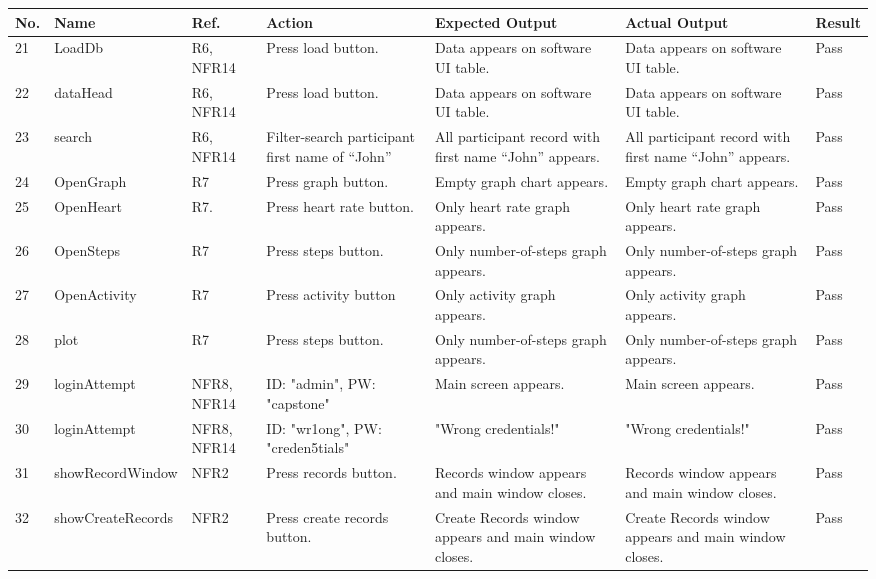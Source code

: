 \documentclass[12pt, titlepage]{article}
\begin{document}
\begin{center}
\begin{table} 
\begin{tabular}{ | p{0.5cm} | p{2.8cm} |  p{1.1cm} | p{2.7cm} | p{2.7cm} | p{2.7cm} | p{1.1cm} |}
\hline
\textbf{No.} & \textbf{Name}  & \textbf{Ref.} & \textbf{Action} & \textbf{Expected Output} & \textbf{Actual Output} & \textbf{Result} \\
\hline
21 & LoadDb & R6, NFR14 & Press load button. & Data appears on software UI table. &  Data appears on software UI table. & Pass \\ 
\hline
22 & dataHead & R6, NFR14 & Press load button. & Data appears on software UI table. & Data appears on software UI table. & Pass \\ 
\hline
23 & search & R6, NFR14 & Filter-search participant first name of “John” & All participant record with first name “John” appears. & All participant record with first name “John” appears. & Pass \\ 
\hline
24 & OpenGraph & R7 & Press graph button. & Empty graph chart appears. & Empty graph chart appears. & Pass \\ 
\hline
25 & OpenHeart & R7. & Press heart rate button. & Only heart rate graph appears. & Only heart rate graph appears. & Pass \\ 
\hline
26 & OpenSteps & R7 & Press steps button. & Only number-of-steps graph appears. & Only number-of-steps graph appears. & Pass \\ 
\hline
27 & OpenActivity & R7 & Press activity button & Only activity graph appears. & Only activity graph appears. & Pass \\ 
\hline
28 & plot & R7 & Press steps button. & Only number-of-steps graph appears. & Only number-of-steps graph appears. & Pass \\ 
\hline
29 & loginAttempt & NFR8, NFR14 & ID: "admin", PW: "capstone" & Main screen appears. & Main screen appears. & Pass \\ 
\hline
30 & loginAttempt & NFR8, NFR14 & ID: "wr1ong", PW: "creden5tials" & "Wrong credentials!" & "Wrong credentials!" & Pass \\ 
\hline
31 & showRecord\newline Window & NFR2 & Press records button. & Records window appears and main window closes. & Records window appears and main window closes. & Pass \\ 
\hline
32 & showCreate\newline Records & NFR2 & Press create records button. & Create Records window appears and main window closes. & Create Records window appears and main window closes. & Pass \\ 
\hline
\end{tabular}
\end{table}
\end{center}
\end{document}
